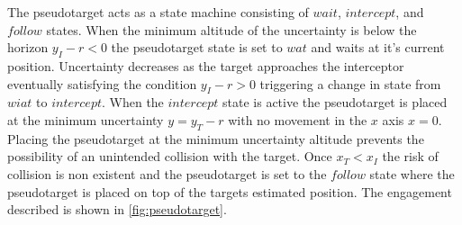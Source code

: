 \documentclass[conference]{IEEEtran}
\begin{document}
The pseudotarget acts as a state machine consisting of $wait$, $intercept$, and $follow$ states. When the minimum altitude of the uncertainty is below the horizon $y_I-r<0$ the pseudotarget state is set to $wat$ and waits at it's current position. Uncertainty decreases as the target approaches the interceptor eventually satisfying the condition $y_I-r >0$ triggering a change in state from $wiat$ to $intercept$. When the $intercept$ state is active the pseudotarget is placed at the minimum uncertainty $y=y_T-r$ with no movement in the $x$ axis $x=0$. Placing the pseudotarget at the minimum uncertainty altitude prevents the possibility of an unintended collision with the target. Once $x_T<x_I$ the risk of collision is non existent and the pseudotarget is set to the $follow$ state where the pseudotarget is placed on top of the targets estimated position. The engagement described is shown in \ref{fig:pseudotarget}.






\end{document}
